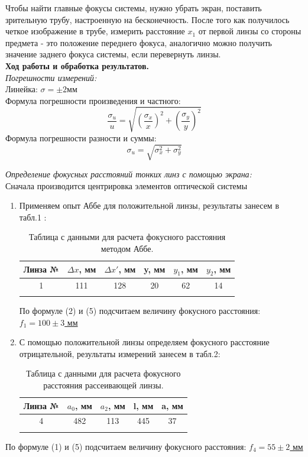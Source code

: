 \documentclass[a4paper, 12pt]{article}%
\newcommand{\RomanNumeralCaps}[1]{\uppercase\expandafter{\romannumeral#1}}
\begin{document}
  	Чтобы найти главные фокусы системы, нужно убрать экран, поставить зрительную трубу, настроенную на бесконечность. После того как получилось четкое изображение в трубе, измерить расстояние $x_1$ от первой линзы со стороны предмета - это положение переднего фокуса, аналогично можно получить значение заднего фокуса системы, если перевернуть линзы.\\
	 
	\textbf{Ход работы и обработка результатов.}\\
	
	\textit{Погрешности измерений:}\\
	Линейка: $\sigma = \pm 2$мм\\
	Формула погрешности произведения и частного:\\
	\begin{equation}
	 \frac{\sigma_u}{u}=\sqrt{\left(\frac{\sigma_x}{x}\right)^2+\left(\frac{\sigma_y}{y}\right)^2}
	\end{equation}
Формула погрешности разности и суммы:
	\begin{equation}
	\sigma_u=\sqrt{\sigma_x^2+\sigma_y^2}
\end{equation}
	 
	 \RomanNumeralCaps 1 \textit{Определение фокусных расстояний тонких линз с помощью экрана:}\\
	 
	 	Сначала производится центрировка элементов оптической системы
	 \begin{enumerate}
	\item Применяем опыт Аббе для положительной линзы, результаты занесем в табл.1 :
	\begin{longtable}{|c|c|c|c|c|c|}
		\hline
		Линза №&$\Delta x$, мм & $\Delta x'$, мм & y, мм & $y_1$, мм & $y_2$, мм \\ \hline
		1 & 111 & 128 & 20 & 62 & 14 \\ \hline
		\caption{Таблица с данными для расчета фокусного расстояния методом Аббе.}
	\end{longtable}
	
	По формуле (2) и (5) подсчитаем величину фокусного расстояния: 
	\underline{$f_1 = 100 \pm 3$ мм} 
	
	\item С помощью положительной линзы определяем фокусного расстояние отрицательной, результаты измерений занесем в табл.2:
	\begin{longtable}{|c|c|c|c|c|}
		\hline
		Линза №&$a_0$, мм & $a_2$, мм & l, мм & a, мм  \\ \hline
		4 & 482 & 113 & 445 & 37 \\ \hline
		\caption{Таблица с данными для расчета фокусного расстояния рассеивающей линзы.}
	\end{longtable}
\end{enumerate}
По формуле (1) и (5) подсчитаем величину фокусного расстояния: 
\underline{$f_4 = 55 \pm 2$ мм} \\
\end{document}
